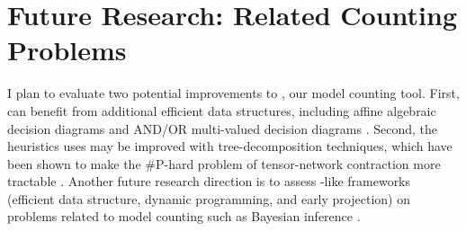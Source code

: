 \documentclass[letterpaper, 12pt]{extarticle}
\begin{document}

\section{Future Research: Related Counting Problems}

I plan to evaluate two potential improvements to \addmc, our model counting tool.
First, \addmc{} can benefit from additional efficient data structures, including affine algebraic decision diagrams \cite{sanner2005affine} and AND/OR multi-valued decision diagrams \cite{mateescu2008and}.
Second, the heuristics \addmc{} uses may be improved with tree-decomposition techniques, which have been shown to make the \#P-hard problem of tensor-network contraction more tractable \cite{dudek2019efficient}.
Another future research direction is to assess \addmc-like frameworks (efficient data structure, dynamic programming, and early projection) on problems related to model counting such as Bayesian inference \cite{pearl1985bayesian}.



\end{document}
